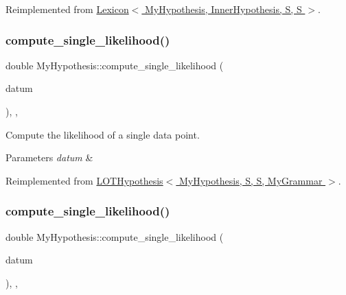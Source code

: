 Reimplemented from \hyperlink{class_lexicon_a2e099a68dd08d62897b40647f92eba1c}{Lexicon$<$ My\+Hypothesis, Inner\+Hypothesis, S, S $>$}.

\mbox{\label{class_my_hypothesis_af23a45a03a28ea4f42438e70d47acacb}} 
\subsubsection{\texorpdfstring{compute\+\_\+single\+\_\+likelihood()}{compute\_single\_likelihood()}\hspace{0.1cm}{\footnotesize\ttfamily [1/4]}}
{\footnotesize\ttfamily double My\+Hypothesis\+::compute\+\_\+single\+\_\+likelihood (\begin{DoxyParamCaption}\item[{const \hyperlink{class_bayesable_a9f1a6c0cd7855550fa10b1a8f13a5867}{datum\+\_\+t} \&}]{datum }\end{DoxyParamCaption})\hspace{0.3cm}{\ttfamily [inline]}, {\ttfamily [override]}, {\ttfamily [virtual]}}



Compute the likelihood of a single data point. 


\begin{DoxyParams}{Parameters}
{\em datum} & \\
\hline
\end{DoxyParams}


Reimplemented from \hyperlink{class_l_o_t_hypothesis_a0ff11e5e328fcfa819a8dd9b5d57bd65}{L\+O\+T\+Hypothesis$<$ My\+Hypothesis, S, S, My\+Grammar $>$}.

\mbox{\label{class_my_hypothesis_af23a45a03a28ea4f42438e70d47acacb}} 
\subsubsection{\texorpdfstring{compute\+\_\+single\+\_\+likelihood()}{compute\_single\_likelihood()}\hspace{0.1cm}{\footnotesize\ttfamily [2/4]}}
{\footnotesize\ttfamily double My\+Hypothesis\+::compute\+\_\+single\+\_\+likelihood (\begin{DoxyParamCaption}\item[{const \hyperlink{class_bayesable_a9f1a6c0cd7855550fa10b1a8f13a5867}{datum\+\_\+t} \&}]{datum }\end{DoxyParamCaption})\hspace{0.3cm}{\ttfamily [inline]}, {\ttfamily [override]}, {\ttfamily [virtual]}}



